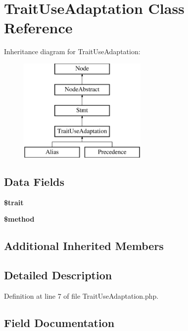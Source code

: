 \section{Trait\+Use\+Adaptation Class Reference}
\label{class_php_parser_1_1_node_1_1_stmt_1_1_trait_use_adaptation}
Inheritance diagram for Trait\+Use\+Adaptation\+:\begin{figure}[H]
\begin{center}
\leavevmode
\includegraphics[height=5.000000cm]{class_php_parser_1_1_node_1_1_stmt_1_1_trait_use_adaptation}
\end{center}
\end{figure}
\subsection*{Data Fields}
\begin{DoxyCompactItemize}
\item 
{\bf \$trait}
\item 
{\bf \$method}
\end{DoxyCompactItemize}
\subsection*{Additional Inherited Members}


\subsection{Detailed Description}


Definition at line 7 of file Trait\+Use\+Adaptation.\+php.



\subsection{Field Documentation}
